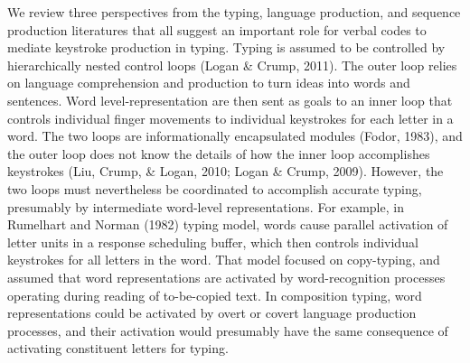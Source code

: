 \documentclass[,man,floatsintext]{apa6}
\begin{document}
We review three perspectives from the typing, language production, and sequence production literatures that all suggest an important role for verbal codes to mediate keystroke production in typing. Typing is assumed to be controlled by hierarchically nested control loops (Logan \& Crump, 2011). The outer loop relies on language comprehension and production to turn ideas into words and sentences. Word level-representation are then sent as goals to an inner loop that controls individual finger movements to individual keystrokes for each letter in a word. The two loops are informationally encapsulated modules (Fodor, 1983), and the outer loop does not know the details of how the inner loop accomplishes keystrokes (Liu, Crump, \& Logan, 2010; Logan \& Crump, 2009). However, the two loops must nevertheless be coordinated to accomplish accurate typing, presumably by intermediate word-level representations. For example, in Rumelhart and Norman (1982) typing model, words cause parallel activation of letter units in a response scheduling buffer, which then controls individual keystrokes for all letters in the word. That model focused on copy-typing, and assumed that word representations are activated by word-recognition processes operating during reading of to-be-copied text. In composition typing, word representations could be activated by overt or covert language production processes, and their activation would presumably have the same consequence of activating constituent letters for typing.
\end{document}

